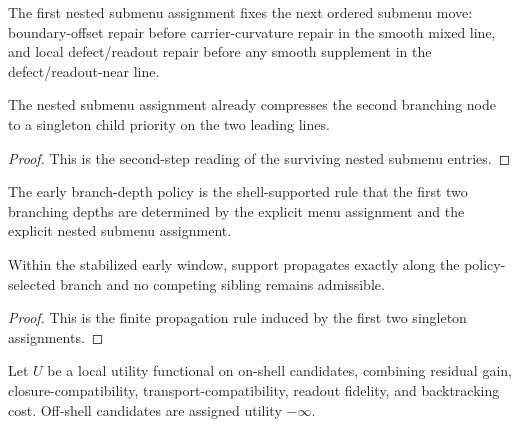 \begin{definition}
\label{def:first-explicit-nested-submenu-assignment-after-the-two-leading-entries}
The first nested submenu assignment fixes the next ordered submenu move: boundary-offset repair before carrier-curvature repair in the smooth mixed line, and local defect/readout repair before any smooth supplement in the defect/readout-near line.
\end{definition}

\begin{proposition}
\label{prop:second-step-priority-readout-of-the-first-nested-submenu-assignment}
The nested submenu assignment already compresses the second branching node to a singleton child priority on the two leading lines.
\end{proposition}

\begin{proof}
This is the second-step reading of the surviving nested submenu entries.
\end{proof}

\begin{definition}
\label{def:first-shell-supported-branch-depth-policy}
The early branch-depth policy is the shell-supported rule that the first two branching depths are determined by the explicit menu assignment and the explicit nested submenu assignment.
\end{definition}

\begin{proposition}
\label{prop:early-depth-support-propagation-under-the-first-branch-depth-policy}
Within the stabilized early window, support propagates exactly along the policy-selected branch and no competing sibling remains admissible.
\end{proposition}

\begin{proof}
This is the finite propagation rule induced by the first two singleton assignments.
\end{proof}

\begin{definition}
\label{def:first-shell-compatible-local-utility-functional}
Let $U$ be a local utility functional on on-shell candidates, combining residual gain, closure-compatibility, transport-compatibility, readout fidelity, and backtracking cost. Off-shell candidates are assigned utility $-\infty$.
\end{definition}

